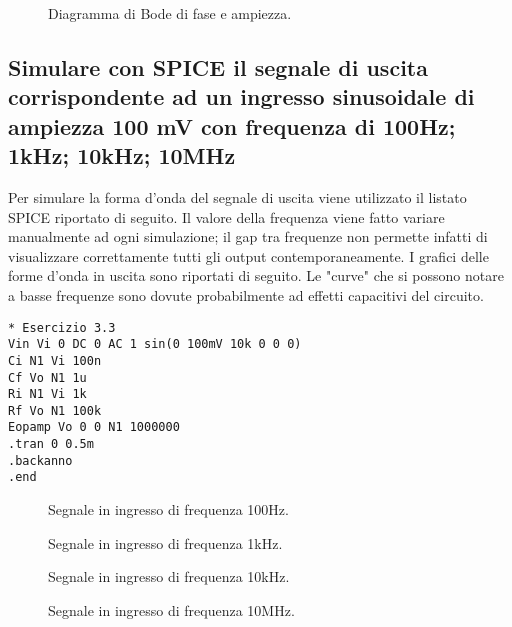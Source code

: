\documentclass[a4paper,10pt]{article}
\begin{document}
\begin{figure}[h!]
	\centering
  	\caption{Diagramma di Bode di fase e ampiezza.}
  	\label{fig:bode3}
\end{figure}
\pagebreak

\subsection{Simulare con SPICE il segnale di uscita corrispondente ad un ingresso sinusoidale di ampiezza 100 mV con frequenza di 100Hz; 1kHz; 10kHz; 10MHz}
Per simulare la forma d'onda del segnale di uscita viene utilizzato il listato SPICE riportato di seguito. Il valore della frequenza viene fatto variare manualmente ad ogni simulazione; il gap tra frequenze non permette infatti di visualizzare correttamente tutti gli output contemporaneamente. I grafici delle forme d'onda in uscita sono riportati di seguito. Le "curve" che si possono notare a basse frequenze sono dovute probabilmente ad effetti capacitivi del circuito. 
\begin{verbatim}
* Esercizio 3.3
Vin Vi 0 DC 0 AC 1 sin(0 100mV 10k 0 0 0)
Ci N1 Vi 100n
Cf Vo N1 1u
Ri N1 Vi 1k
Rf Vo N1 100k
Eopamp Vo 0 0 N1 1000000
.tran 0 0.5m
.backanno
.end
\end{verbatim}

\begin{figure}[h!]
	\centering
  	\caption{Segnale in ingresso di frequenza 100Hz.}
  	\label{fig:out100}
\end{figure}
\begin{figure}[h!]
	\centering
  	\caption{Segnale in ingresso di frequenza 1kHz.}
  	\label{fig:out1k}
\end{figure}
\begin{figure}[h!]
	\centering
  	\caption{Segnale in ingresso di frequenza 10kHz.}
  	\label{fig:out100k}
\end{figure}
\begin{figure}[h!]
	\centering
  	\caption{Segnale in ingresso di frequenza 10MHz.}
  	\label{fig:out10meg}
\end{figure}
\end{document}

